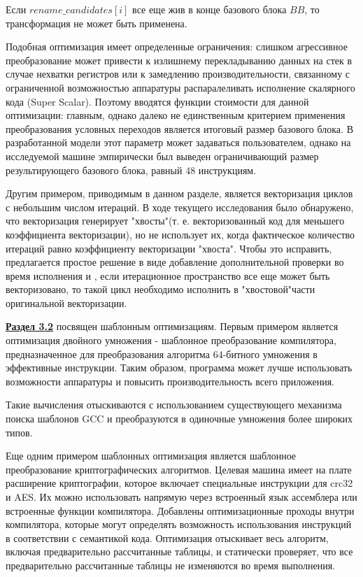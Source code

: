 Если $rename\_candidates[i]$ все еще жив в конце базового блока $BB$, то трансформация не может быть применена.

Подобная оптимизация имеет определенные ограничения: слишком агрессивное преобразование может привести к излишнему перекладыванию данных на стек в случае нехватки регистров или к замедлению производительности, связанному с ограниченной возможностью аппаратуры распаралеливать исполнение скалярного кода (Super Scalar).  Поэтому вводятся функции
стоимости для данной оптимизации: главным, однако далеко не единственным
критерием применения преобразования условных переходов является итоговый
размер базового блока. В разработанной модели этот параметр может задаваться
пользователем, однако на исследуемой машине эмпирически был выведен
ограничивающий размер результирующего базового блока, равный 48 инструкциям.


Другим примером, приводимым в данном разделе, является  векторизация циклов с небольшим числом итераций.  В ходе текущего исследования было обнаружено, что векторизация
генерирует "хвосты"\phantom{ }(т. е. векторизованный код для меньшего коэффициента
векторизации), но не использует их, когда фактическое количество итераций
равно коэффициенту векторизации "хвоста".  Чтобы это исправить, предлагается простое решение в виде добавление дополнительной проверки во время исполнения и , если итерационное пространство все еще может быть векторизовано, то такой цикл необходимо исполнить в "хвостовой"\phantom{ }части оригинальной векторизации.

 \underline{\textbf{Раздел 3.2}} посвящен шаблонным  оптимизациям. Первым примером является оптимизация двойного умножения - шаблонное преобразование
 компилятора, предназначенное для преобразования алгоритма 64-битного умножения
 в эффективные инструкции. Таким образом, программа может лучше
 использовать возможности аппаратуры и повысить производительность всего
 приложения.
 
 Такие вычисления отыскиваются с использованием существующего механизма поиска шаблонов GCC и преобразуются в одиночные умножения более широких типов.
 
 
 Еще одним примером шаблонных оптимизация является шаблонное преобразование криптографических алгоритмов. Целевая машина имеет на плате расширение криптографии,
 которое включает специальные инструкции для crc32 и AES. Их можно использовать
 напрямую через встроенный язык ассемблера или встроенные функции
 компилятора. Добавлены оптимизационные проходы внутри компилятора, которые могут определять
 возможность использования инструкций в соответствии с семантикой
 кода.
 Оптимизация отыскивает весь алгоритм, включая предварительно
 рассчитанные таблицы, и статически проверяет, что все предварительно
 рассчитанные таблицы не изменяются во время выполнения.
 
